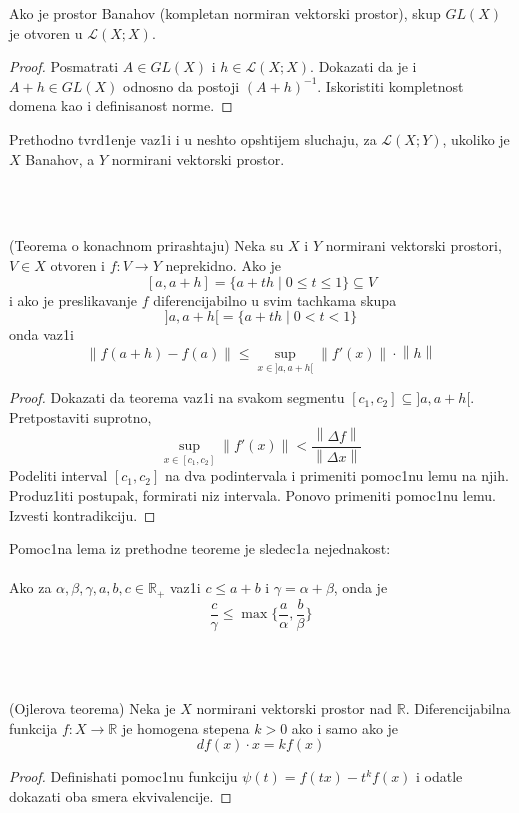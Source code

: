 \documentclass[a4paper,12pt]{article}
\newcommand{\R}{\mathbb{R}}
\newcommand{\psj}{\subseteq}
\newcommand{\norm}[1]{\left\lVert#1\right\rVert}
\begin{document}
\begin{tvr}
Ako je prostor Banahov (kompletan normiran vektorski prostor), skup $GL(X)$ je otvoren u $\mathcal{L}(X;X)$.
\end{tvr}
\begin{proof}
Posmatrati $A \in GL(X)$ i $h \in \mathcal{L} (X;X)$. Dokazati da je i $A+h \in GL(X)$ odnosno da postoji ${(A+h)}^{-1}$. Iskoristiti kompletnost domena kao i definisanost norme.
\end{proof}

\begin{nap}
Prethodno tvrd1enje vaz1i i u neshto opshtijem sluchaju, za $\mathcal{L}(X;Y)$, ukoliko je $X$ Banahov, a $Y$ normirani vektorski prostor.
\end{nap}
\\ \\
\begin{tma}
(Teorema o konachnom prirashtaju) Neka su $X$ i $Y$ normirani vektorski prostori, $V \in X$ otvoren i $f:V \to Y$ neprekidno. Ako je 
\[ [a, a+h] = \{a+th \mid 0 \leq t \leq 1\} \psj V \]
i ako je preslikavanje $f$ diferencijabilno u svim tachkama skupa 
\[]a, a+h[ = \{a+th \mid 0 < t < 1\}\]
onda vaz1i 
\[\norm{f(a+h) - f(a)} \leq \sup_{x \in ]a, a+h[} \norm{f'(x)} \cdot \norm{h}\]
\end{tma}
\begin{proof}
Dokazati da teorema vaz1i na svakom segmentu $[c_1, c_2] \psj ]a, a+h[$. Pretpostaviti suprotno, 
\[ \sup_{x \in [c_1, c_2]} \norm{f'(x)} < \frac{\norm{\Delta f}}{\norm{\Delta x}} \]
Podeliti interval $[c_1, c_2]$ na dva podintervala i primeniti pomoc1nu lemu na njih. Pro\-du\-z1i\-ti postupak, formirati niz intervala. Ponovo primeniti pomoc1nu lemu. Izvesti kon\-tra\-dik\-ci\-ju.
\end{proof}

\begin{nap}
Pomoc1na lema iz prethodne teoreme je sledec1a nejednakost: \\ \\
Ako za $\alpha, \beta, \gamma, a, b, c \in \R_+ $ vaz1i $c \leq a+b$ i $\gamma = \alpha + \beta$, onda je
\[\frac{c}{\gamma} \leq \max \{ \frac{a}{\alpha}, \frac{b}{\beta} \} \]
\end{nap}
\\ \\
\begin{tma}
(Ojlerova teorema) Neka je $X$ normirani vektorski prostor nad $\R$. Di\-fe\-ren\-ci\-ja\-bil\-na funkcija $f: X \to \R$ je homogena stepena $k>0$ ako i samo ako je \[df(x) \cdot x = k f(x)\]
\end{tma}
\begin{proof}
Definishati pomoc1nu funkciju $\psi (t) = f(tx) - t^kf(x)$ i odatle dokazati oba smera ekvivalencije. 
\end{proof}
\end{document}
